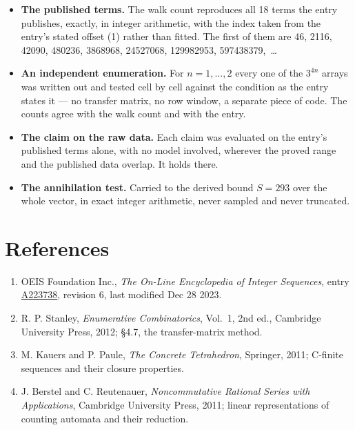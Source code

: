 \documentclass[11pt]{article}
\theoremstyle{definition}
\begin{document}
\begin{itemize}

\item {\bfseries The published terms.} The walk count reproduces all 18 terms the entry publishes, exactly, in integer arithmetic, with the index taken from the entry's stated offset (1) rather than fitted. The first of them are 46, 2116, 42090, 480236, 3868968, 24527068, 129982953, 597438379,~\dots

\item {\bfseries An independent enumeration.} For $n = 1,\dots,2$ every one of the $3^{4n}$ arrays was written out and tested cell by cell against the condition as the entry states it --- no transfer matrix, no row window, a separate piece of code. The counts agree with the walk count and with the entry.

\item {\bfseries The claim on the raw data.} Each claim was evaluated on the entry's published terms alone, with no model involved, wherever the proved range and the published data overlap. It holds there.

\item {\bfseries The annihilation test.} Carried to the derived bound $S = 293$ over the whole vector, in exact integer arithmetic, never sampled and never truncated.

\end{itemize}

\section{References}

\begin{enumerate}

\item OEIS Foundation Inc., \emph{The On-Line Encyclopedia of Integer Sequences}, entry \href{https://oeis.org/A223738}{A223738}, revision 6, last modified Dec 28 2023.

\item R. P. Stanley, \emph{Enumerative Combinatorics}, Vol.~1, 2nd ed., Cambridge University Press, 2012; \S4.7, the transfer-matrix method.

\item M. Kauers and P. Paule, \emph{The Concrete Tetrahedron}, Springer, 2011; C-finite sequences and their closure properties.

\item J. Berstel and C. Reutenauer, \emph{Noncommutative Rational Series with Applications}, Cambridge University Press, 2011; linear representations of counting automata and their reduction.

\end{enumerate}
\end{document}
